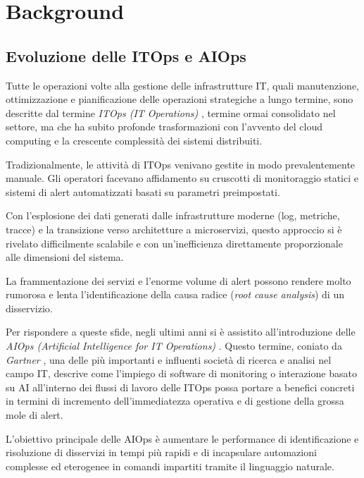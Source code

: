\chapter{Background}

\section{Evoluzione delle ITOps e AIOps}

Tutte le operazioni volte alla gestione delle infrastrutture IT, quali manutenzione, ottimizzazione e pianificazione delle operazioni strategiche a lungo termine, sono descritte dal termine \textit{ITOps (IT Operations)} \cite{IBM_itops}, termine ormai consolidato nel settore, ma che ha subito profonde trasformazioni con l'avvento del cloud computing e la crescente complessità dei sistemi distribuiti.

Tradizionalmente, le attività di ITOps venivano gestite in modo prevalentemente manuale. Gli operatori facevano affidamento su cruscotti di monitoraggio statici e sistemi di alert automatizzati basati su parametri preimpostati.

Con l'esplosione dei dati generati dalle infrastrutture moderne (log, metriche, tracce) e la transizione verso architetture a microservizi, questo approccio si è rivelato difficilmente scalabile e con un'inefficienza direttamente proporzionale alle dimensioni del sistema.

La frammentazione dei servizi e l'enorme volume di alert possono rendere molto rumorosa e lenta l'identificazione della causa radice (\textit{root cause analysis}) di un disservizio.

Per rispondere a queste sfide, negli ultimi anni si è assistito all'introduzione delle \textit{AIOps (Artificial Intelligence for IT Operations)} \cite{IBM_aiops}. Questo termine, coniato da \textit{Gartner} \cite{Gartner_aiops}, una delle più importanti e influenti società di ricerca e analisi nel campo IT, descrive come l'impiego di software di monitoring o interazione basato su AI all'interno dei flussi di lavoro delle ITOps possa portare a benefici concreti in termini di incremento dell'immediatezza operativa e di gestione della grossa mole di alert.

L'obiettivo principale delle AIOps è aumentare le performance di identificazione e risoluzione di disservizi in tempi più rapidi e di incapsulare automazioni complesse ed eterogenee in comandi impartiti tramite il linguaggio naturale.

